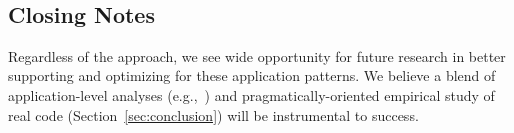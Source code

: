 


\




\subsection{Closing Notes}

Regardless of the approach, we see wide
opportunity for future research in better supporting and optimizing
for these application patterns. We believe a blend of application-level analyses
(e.g.,~\cite{statusquo,coord-avoid}) and pragmatically-oriented
empirical study of real code
(Section~\ref{sec:conclusion}) will be instrumental to success.
